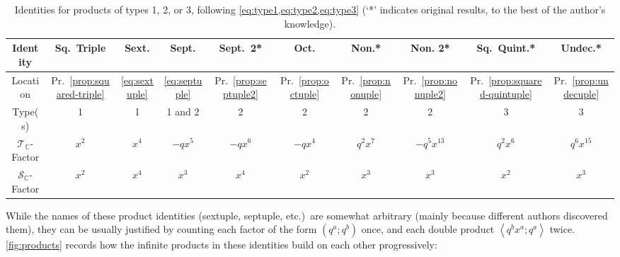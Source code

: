 \documentclass[reqno,11pt]{amsart}
\theoremstyle{definition}
\theoremstyle{remark}
\numberwithin{equation}{section}
\renewcommand{\arraystretch}{1.2}
\newcommand{\C}{\mathbb{C}}
\newcommand{\mT}{\mathcal{T}}
\newcommand{\mS}{\mathcal{S}}
\newcommand{\la}{\left\langle}
\newcommand{\ra}{\right\rangle}
\begin{document}
\begin{table}[ht]
\renewcommand{\arraystretch}{1.3}
    \captionsetup{width=0.7\linewidth}
    \centering \small
    \begin{tabular}{c|c|c|c|c|c|c|c|c|c}
         Identity 
         & Sq.\ Triple
         & Sext.
         & Sept.
         & Sept.\ 2*
         & Oct.
         & Non.*
         & Non. 2*
         & Sq.\ Quint.*
         & Undec.*
         \\\hline
         Location
         & Pr.\ \ref{prop:squared-triple}
         & \cref{eq:sextuple}
         & \cref{eq:septuple}
         & Pr.\ \ref{prop:septuple2}
         & Pr.\ \ref{prop:octuple} 
         & Pr.\ \ref{prop:nonuple}
         & Pr.\ \ref{prop:nonuple2}
         & Pr.\ \ref{prop:squared-quintuple}
         & Pr.\ \ref{prop:undecuple}
         \\\hline
         Type(s)
         & 1
         & 1
         & 1 and 2
         & 2
         & 2
         & 2
         & 2
         & 3
         & 3
         \\\hline
         $\mT_\C$-Factor
         & $x^2$
         & $x^4$
         & $-qx^5$
         & $-qx^6$
         & $-qx^4$
         & $q^2x^7$
         & $-q^5x^{13}$
         & $q^2x^6$
         & $q^6x^{15}$
         \\\hline
         $\mS_\C$-Factor 
         & $x^2$
         & $x^4$
         & $x^3$
         & $x^4$
         & $x^2$
         & $x^3$
         & $x^3$
         & $x^2$
         & $x^3$
    \end{tabular}
    \caption{Identities for products of types 1, 2, or 3, following \cref{eq:type1,eq:type2,eq:type3} (`*' indicates original results, to the best of the author's knowledge).}
    \label{tbl:products}
\end{table}
While the names of these product identities (sextuple, septuple, etc.)\ are somewhat arbitrary (mainly because different authors discovered them), they can be usually justified by counting each factor of the form $(q^a; q^b)$ once, and each double product $\la q^b x^a; q^a \ra$ twice. \cref{fig:products} records how the infinite products in these identities build on each other progressively:
\end{document}
